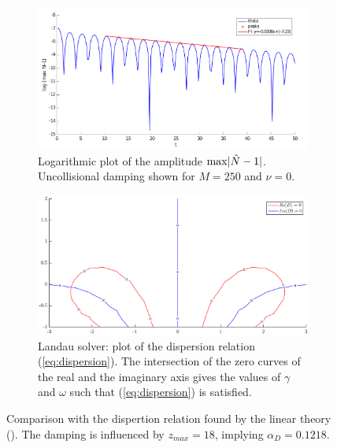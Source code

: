 \documentclass[final]{jpp}
\DeclarePairedDelimiter\abs{\lvert}{\rvert}
\begin{document}
\begin{figure}
\begin{subfigure}{0.47\textwidth}
\includegraphics[width=\textwidth]{damping.pdf}
\caption{Logarithmic plot of the amplitude $\max\abs{\hat{N} - 1}$. Uncollisional damping shown for $M = 250$ and $\hat{\nu} = 0$.}
\label{fig:disp-damping}
\end{subfigure}
\hspace{0.05\textwidth}
\begin{subfigure}{0.47\textwidth}
\includegraphics[width=\textwidth]{curve.eps}
\caption{Landau solver: plot of the dispersion relation (\ref{eq:dispersion}). The intersection of the zero curves of the real and the imaginary axis gives the values of $\gamma$ and $\omega$ such that (\ref{eq:dispersion}) is satisfied.}
\label{fig:disp-landau}
\end{subfigure}
\caption{Comparison with the dispertion relation found by the linear theory (\cite{linear}). The damping is influenced by $z_{max} = 18$, implying $\alpha_D = 0.1218$.}
\end{figure}
\end{document}
